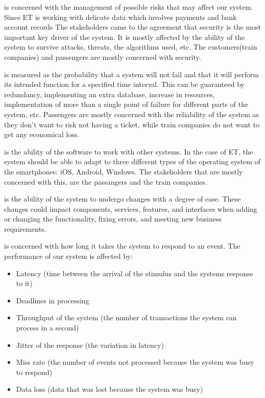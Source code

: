 \begin{description}[align=left]
  \item[Security] is concerned with the management of possible risks that may affect our system. Since \ac{ET} is working with delicate data which involves payments and bank account records The stakeholders came to the agreement that security is the most important key driver of the system. It is mostly affected by the ability of the system to survive attacks, threats, the algorithms used, etc. The customers(train companies) and passengers are mostly concerned with security. 
  
  \item[Reliability] is measured as the probability that a system will not fail and that it will perform its intended function for a specified time interval. This can be guaranteed by  redundancy, implementing an extra database, increase in resources, implementation of more than a single point of failure for different parts of the system, etc. Passengers are mostly concerned with the reliability of the system as they don't want to risk not having a ticket, while train companies do not want to get any economical loss. 
  
  \item[Compatibility] is the ability of the software to work with other systems. In the case of \ac{ET}, the system should be able to adapt to three different types of the operating system of the smartphones: iOS, Android, Windows. The stakeholders that are mostly concerned with this, are the passangers and the train companies.  

  \item[Maintainability]  is the \cite{web:software} ability of the system to undergo changes with a degree of ease. These changes could impact components, services, features, and interfaces when adding or changing the functionality, fixing errors, and meeting new business requirements.

  \item[Performance] is concerned with how long it takes the system to respond to an event. The performance of our system is affected by:

  \begin{itemize}
    \item Latency (time between the arrival of the stimulus and the systems response to it)
    \item Deadlines in processing
    \item Throughput of the system (the number of transactions the system can process in a second)
    \item Jitter of the response (the variation in latency)
    \item Miss rate (the number of events not processed because the system was busy to respond)
    \item Data loss (data that was lost because the system was busy)
  \end{itemize}


\end{description}
